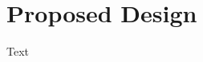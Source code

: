 \documentclass[../main.tex]{subfiles}
\begin{document}
\chapter{Proposed Design}
Text
\end{document}
